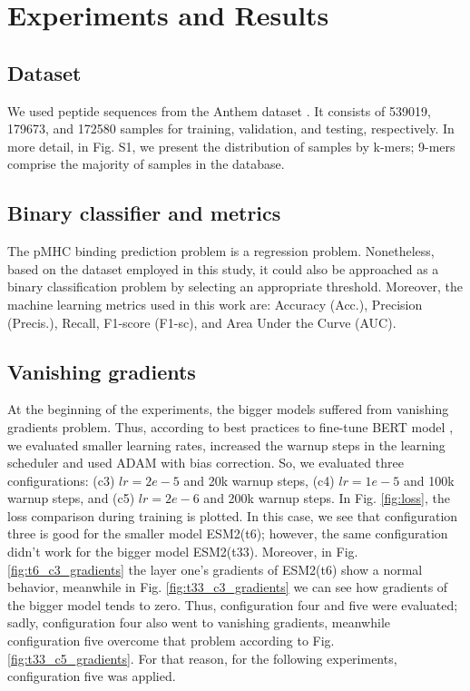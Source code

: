 \section{Experiments and Results}

\subsection{Dataset}
We used peptide sequences from the Anthem dataset \cite{mei2021anthem}. It consists of 539019, 179673, and 172580 samples for training, validation, and testing, respectively. In more detail, in Fig. S1, we present the distribution of samples by k-mers; 9-mers comprise the majority of samples in the database.

\subsection{Binary classifier and metrics}
The pMHC binding prediction problem is a regression problem. Nonetheless, based on the dataset employed in this study, it could also be approached as a binary classification problem by selecting an appropriate threshold. Moreover, the machine learning metrics used in this work are: Accuracy (Acc.), Precision (Precis.), Recall, F1-score (F1-sc), and Area Under the Curve (AUC).

\subsection{Vanishing gradients}
At the beginning of the experiments, the bigger models suffered from vanishing gradients problem. Thus, according to best practices to fine-tune BERT model \cite{mosbach2020stability}, we evaluated smaller learning rates, increased the warnup steps in the learning scheduler and used ADAM with bias correction. So, we evaluated three configurations: (c3) $lr=2e-5$ and 20k warnup steps, (c4) $lr=1e-5$ and 100k warnup steps, and (c5) $lr=2e-6$ and 200k warnup steps. In Fig. \ref{fig:loss}, the loss comparison during training is plotted. In this case, we see that configuration three is good for the smaller model ESM2(t6); however, the same configuration didn't work for the bigger model ESM2(t33). Moreover, in Fig. \ref{fig:t6_c3_gradients} the layer one's gradients of ESM2(t6) show a normal behavior, meanwhile in Fig. \ref{fig:t33_c3_gradients} we can see how gradients of the bigger model tends to zero. Thus, configuration four and five were evaluated; sadly, configuration four also went to vanishing gradients, meanwhile configuration five overcome that problem according to Fig. \ref{fig:t33_c5_gradients}. For that reason, for the following experiments, configuration five was applied.

